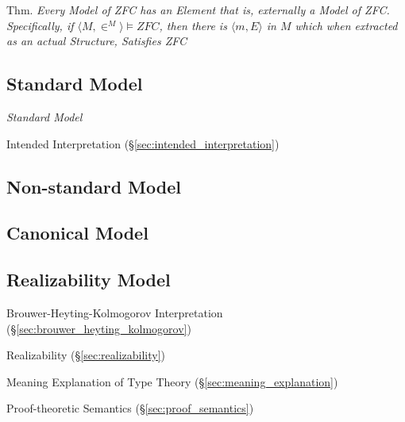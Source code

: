 Thm. \emph{Every Model of ZFC has an Element that is, externally a
  Model of ZFC. Specifically, if $\langle{M,\in^M}\rangle \vDash ZFC$,
then there is $\langle{m,E}\rangle$ in $M$ which when extracted as an
actual Structure, Satisfies ZFC}



\subsection{Standard Model}\label{sec:standard_model}

\emph{Standard Model}

Intended Interpretation (\S\ref{sec:intended_interpretation})



\subsection{Non-standard Model}\label{sec:nonstandard_model}

\subsection{Canonical Model}\label{sec:canonical_model}

\subsection{Realizability Model}\label{sec:realizability_model}

Brouwer-Heyting-Kolmogorov Interpretation
(\S\ref{sec:brouwer_heyting_kolmogorov})

Realizability (\S\ref{sec:realizability})

Meaning Explanation of Type Theory (\S\ref{sec:meaning_explanation})

Proof-theoretic Semantics (\S\ref{sec:proof_semantics})




